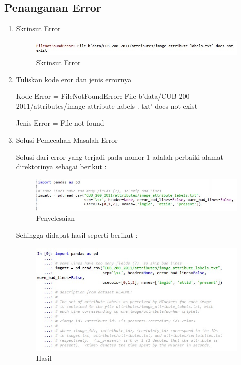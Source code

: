 \subsection{Penanganan Error}
\begin{enumerate}
\item Skrinsut Error
	\begin{figure}[ht]
	\centering
	\includegraphics[scale=0.5]{figures/l1.jpg}
	\caption{Skrinsut Error}
	\label{contoh}
	\end{figure}
\item Tuliskan kode eror dan jenis errornya
	\par Kode Error = FileNotFoundError: File b'data/CUB 200 2011/attributes/image attribute labels . txt' does not exist
	\par Jenis Error = File not found
\item Solusi Pemecahan Masalah Error
\par Solusi dari error yang terjadi pada nomor 1 adalah perbaiki alamat direktorinya sebagai berikut :
	\begin{figure}[ht]
	\centering
	\includegraphics[scale=0.5]{figures/l2.jpg}
	\caption{Penyelesaian}
	\label{contoh}
	\end{figure}
\par Sehingga didapat hasil seperti berikut :
	\begin{figure}[ht]
	\centering
	\includegraphics[scale=0.5]{figures/k41.jpg}
	\caption{Hasil}
	\label{contoh}
	\end{figure}
\end{enumerate}




